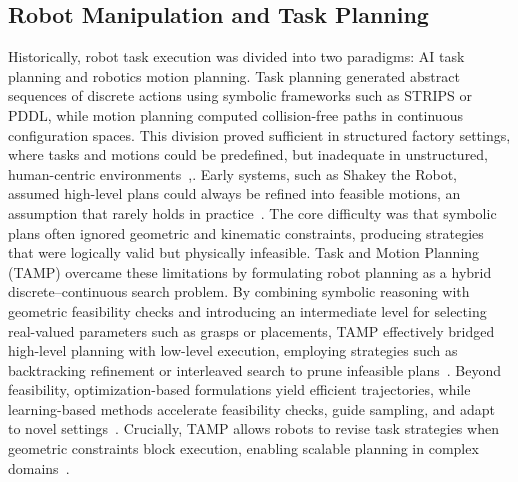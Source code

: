 \documentclass[12pt]{extarticle}
\begin{document}
\subsection{Robot Manipulation and Task Planning}
Historically, robot task execution was divided into two paradigms: AI task planning and robotics motion planning. Task planning generated abstract sequences of discrete actions using symbolic frameworks such as STRIPS or PDDL, while motion planning computed collision-free paths in continuous configuration spaces. This division proved sufficient in structured factory settings, where tasks and motions could be predefined, but inadequate in unstructured, human-centric environments~\cite{tamp},\cite{optimizatoin-and-motion-planning}. Early systems, such as Shakey the Robot, assumed high-level plans could always be refined into feasible motions, an assumption that rarely holds in practice~\cite{recent-trends-in-tamp}. The core difficulty was that symbolic plans often ignored geometric and kinematic constraints, producing strategies that were logically valid but physically infeasible. Task and Motion Planning (TAMP) overcame these limitations by formulating robot planning as a hybrid discrete–continuous search problem. By combining symbolic reasoning with geometric feasibility checks and introducing an intermediate level for selecting real-valued parameters such as grasps or placements, TAMP effectively bridged high-level planning with low-level execution, employing strategies such as backtracking refinement or interleaved search to prune infeasible plans~\cite{tamp}. Beyond feasibility, optimization-based formulations yield efficient trajectories, while learning-based methods accelerate feasibility checks, guide sampling, and adapt to novel settings~\cite{optimizatoin-and-motion-planning}. Crucially, TAMP allows robots to revise task strategies when geometric constraints block execution, enabling scalable planning in complex domains~\cite{recent-trends-in-tamp}.
\end{document}
